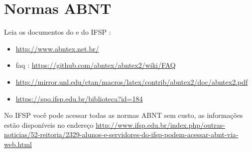 \section{Normas ABNT}

Leia os documentos do \abnTeX e do IFSP :
\begin{itemize}
    \item \url{http://www.abntex.net.br/}
    
    \item \acs{faq} : \url{https://github.com/abntex/abntex2/wiki/FAQ}
    
    \item \url{http://mirror.unl.edu/ctan/macros/latex/contrib/abntex2/doc/abntex2.pdf}
    
    \item \url{https://spo.ifsp.edu.br/biblioteca?id=184}
\end{itemize}

No IFSP você pode acessar todas as normas ABNT sem custo, as informações estão disponíveis no endereço \url{http://www.ifsp.edu.br/index.php/outras-noticias/52-reitoria/2329-alunos-e-servidores-do-ifsp-podem-acessar-abnt-via-web.html}

